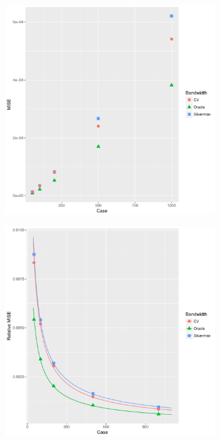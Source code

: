 \begin{figure}[htbp]
    \centering
    \begin{subfigure}[b]{0.24\textwidth}
    \includegraphics[width=\textwidth]{results/by_num_cases/MISE-vs-cases}
    \label{fig:ise:unif_NCases_1h:mise}
    \end{subfigure}
    \begin{subfigure}[b]{0.24\textwidth}
    \includegraphics[width=\textwidth]{results/by_num_cases/RMISE-vs-cases}

\end{subfigure}
\end{figure}
